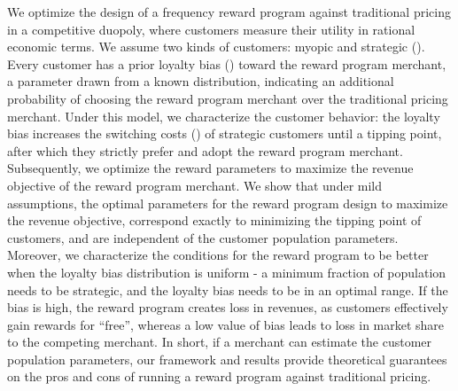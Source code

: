 We optimize the design of a frequency reward program against traditional pricing in a competitive duopoly, where customers measure their utility in rational economic terms.
We assume two kinds of customers: myopic and strategic (\cite{yilmaz2016upgrade}). 
Every customer has a prior loyalty bias (\cite{fader1993excess}) toward the reward program merchant, a parameter drawn from a known distribution, indicating an additional probability of choosing the reward program merchant over the traditional pricing merchant.
Under this model, we characterize the customer behavior: the loyalty bias increases the switching costs (\cite{klemperer1995competition}) of strategic customers until a tipping point, after which they strictly prefer and adopt the reward program merchant. 
Subsequently, we optimize the reward parameters to maximize the revenue objective of the reward program merchant.
We show that under mild assumptions, the optimal parameters for the reward program design to maximize the revenue objective, correspond exactly to minimizing the tipping point of customers, and are independent of the customer population parameters. 
Moreover, we characterize the conditions for the reward program to be better when the loyalty bias distribution is uniform - a minimum fraction of population needs to be strategic, and the loyalty bias needs to be in an optimal range.
If the bias is high, the reward program creates loss in revenues, as customers effectively gain rewards for ``free'', whereas a low value of bias leads to loss in market share to the competing merchant.
In short, if a merchant can estimate the customer population parameters, our framework and results provide theoretical guarantees on the pros and cons of running a reward program against traditional pricing.
